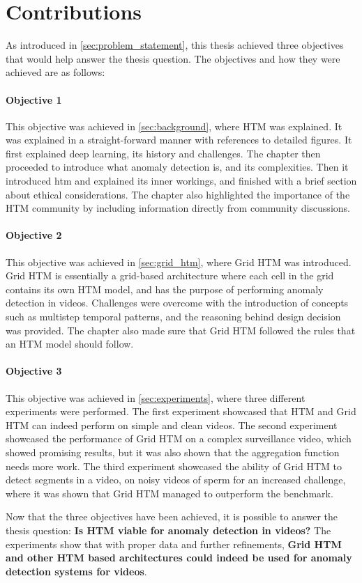 \section{Contributions}
As introduced in \autoref{sec:problem_statement}, this thesis achieved three objectives that would help answer the thesis question. The objectives and how they were achieved are as follows:
\par
\paragraph*{Objective 1} \emph{}
\par
This objective was achieved in \autoref{sec:background}, where HTM was explained. It was explained in a straight-forward manner with references to detailed figures. It first explained deep learning, its history and challenges. The chapter then proceeded to introduce what anomaly detection is, and its complexities. Then it introduced \gls*{htm} and explained its inner workings, and finished with a brief section about ethical considerations. The chapter also highlighted the importance of the HTM community by including information directly from community discussions.
\paragraph*{Objective 2} \emph{}
\par
This objective was achieved in \autoref{sec:grid_htm}, where Grid HTM was introduced. Grid HTM is essentially a grid-based architecture where each cell in the grid contains its own HTM model, and has the purpose of performing anomaly detection in videos. Challenges were overcome with the introduction of concepts such as multistep temporal patterns, and the reasoning behind design decision was provided. The chapter also made sure that Grid HTM followed the rules that an HTM model should follow.
\paragraph*{Objective 3} \emph{}
\par
This objective was achieved in \autoref{sec:experiments}, where three different experiments were performed. The first experiment showcased that HTM and Grid HTM can indeed perform on simple and clean videos. The second experiment showcased the performance of Grid HTM on a complex surveillance video, which showed promising results, but it was also shown that the aggregation function needs more work. The third experiment showcased the ability of Grid HTM to detect segments in a video, on noisy videos of sperm for an increased challenge, where it was shown that Grid HTM managed to outperform the benchmark.
\par
Now that the three objectives have been achieved, it is possible to answer the thesis question: \textbf{Is HTM viable for anomaly detection in videos?} The experiments show that with proper data and further refinements, \textbf{Grid HTM and other HTM based architectures could indeed be used for anomaly detection systems for videos}.
